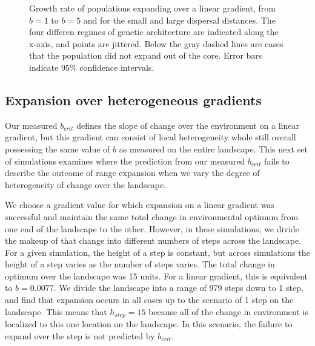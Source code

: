 \begin{figure}[h]
\centering
{}
\caption[Growth rate of populations expanding over a linear gradient.]{Growth rate of populations expanding over a linear gradient, from $b = 1$ to $b = 5$ and for the small and large dispersal distances. The four differen regimes of genetic architecture are indicated along the x-axis, and points are jittered. Below the gray dashed lines are cases that the population did not expand out of the core. Error bars indicate 95\% confidence intervals.}
\label{fig:linearspeed}
\end{figure}



\subsection{Expansion over heterogeneous gradients}

Our measured $b_{crit}$ defines the slope of change over the environment on a linear gradient, but this gradient can consist of local heterogeneity whole still overall possessing the same value of $b$ as measured on the entire landscape. This next set of simulations examines where the prediction from our measured $b_{crit}$ fails to describe the outcome of range expansion when we vary the degree of heterogeneity of change over the landscape. 

We choose a gradient value for which expansion on a linear gradient was successful and maintain the same total change in environmental optimum from one end of the landscape to the other. However, in these simulations, we divide the makeup of that change into different numbers of steps across the landscape. For a given simulation, the height of a step is constant, but across simulations the height of a step varies as the number of steps varies. The total change in optimum over the landscape was 15 units. For a linear gradient, this is equivalent to $b = 0.0077$. We divide the landscape into a range of 979 steps down to 1 step, and find that expansion occurs in all cases up to the scenario of 1 step on the landscape. This means that $h_{step} = 15$ because all of the change in environment is localized to this one location on the landscape. In this scenario, the failure to expand over the step is not predicted by $b_{crit}$. %

